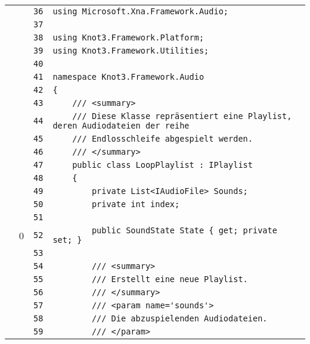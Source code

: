 \documentclass[a4paper,10pt]{article}
\begin{document}
\begin{longtable}[l]{lrrl}
\cellcolor{gray} &  & \verb~36~ & \verb~using Microsoft.Xna.Framework.Audio;~\\
\cellcolor{gray} &  & \verb~37~ & \verb~~\\
\cellcolor{gray} &  & \verb~38~ & \verb~using Knot3.Framework.Platform;~\\
\cellcolor{gray} &  & \verb~39~ & \verb~using Knot3.Framework.Utilities;~\\
\cellcolor{gray} &  & \verb~40~ & \verb~~\\
\cellcolor{gray} &  & \verb~41~ & \verb~namespace Knot3.Framework.Audio~\\
\cellcolor{gray} &  & \verb~42~ & \verb~{~\\
\cellcolor{gray} &  & \verb~43~ & \verb~    /// <summary>~\\
\cellcolor{gray} &  & \verb~44~ & \verb~    /// Diese Klasse repräsentiert eine Playlist, deren Audiodateien der reihe~\\
\cellcolor{gray} &  & \verb~45~ & \verb~    /// Endlosschleife abgespielt werden.~\\
\cellcolor{gray} &  & \verb~46~ & \verb~    /// </summary>~\\
\cellcolor{gray} &  & \verb~47~ & \verb~    public class LoopPlaylist : IPlaylist~\\
\cellcolor{gray} &  & \verb~48~ & \verb~    {~\\
\cellcolor{gray} &  & \verb~49~ & \verb~        private List<IAudioFile> Sounds;~\\
\cellcolor{gray} &  & \verb~50~ & \verb~        private int index;~\\
\cellcolor{gray} &  & \verb~51~ & \verb~~\\
\cellcolor{red} & 0 & \verb~52~ & \verb~        public SoundState State { get; private set; }~\\
\cellcolor{gray} &  & \verb~53~ & \verb~~\\
\cellcolor{gray} &  & \verb~54~ & \verb~        /// <summary>~\\
\cellcolor{gray} &  & \verb~55~ & \verb~        /// Erstellt eine neue Playlist.~\\
\cellcolor{gray} &  & \verb~56~ & \verb~        /// </summary>~\\
\cellcolor{gray} &  & \verb~57~ & \verb~        /// <param name='sounds'>~\\
\cellcolor{gray} &  & \verb~58~ & \verb~        /// Die abzuspielenden Audiodateien.~\\
\cellcolor{gray} &  & \verb~59~ & \verb~        /// </param>~\\

\end{longtable}
\end{document}
